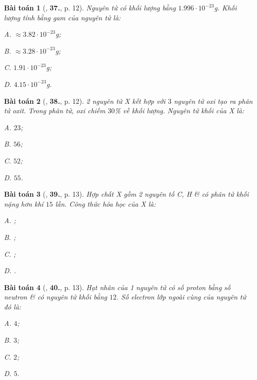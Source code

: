 \documentclass{article}
\numberwithin{equation}{section}
\newtheorem{baitoan}{Bài toán}[section]
\begin{document}
\begin{baitoan}[\cite{An2011}, \textbf{37.}, p. 12]
	Nguyên tử  có khối lượng bằng $1.996\cdot 10^{-23}$g. Khối lượng tính bằng gam của nguyên tử  là:
	\begin{enumerate*}
		\item[{\rm\sf A.}] $\approx3.82\cdot10^{-23}$g;
		\item[{\rm\sf B.}] $\approx3.28\cdot10^{-23}$g;
		\item[{\rm\sf C.}] $1.91\cdot10^{-23}$g;
		\item[{\rm\sf D.}] $4.15\cdot10^{-23}$g.
	\end{enumerate*}
\end{baitoan}

\begin{baitoan}[\cite{An2011}, \textbf{38.}, p. 12]
	2 nguyên tử X kết hợp với $3$ nguyên tử oxi tạo ra phân tử oxit. Trong phân tử, oxi chiếm $30$\% về khối lượng. Nguyên tử khối của X là:
	\begin{enumerate*}
		\item[{\rm\sf A.}] $23$;
		\item[{\rm\sf B.}] $56$;
		\item[{\rm\sf C.}] $52$;
		\item[{\rm\sf D.}] $55$.
	\end{enumerate*}
\end{baitoan}

\begin{baitoan}[\cite{An2011}, \textbf{39.}, p. 13]
	Hợp chất X gồm 2 nguyên tố C, H \& có phân tử khối nặng hơn khí  $15$ lần. Công thức hóa học của X là:
	\begin{enumerate*}
		\item[{\rm\sf A.}] ;
		\item[{\rm\sf B.}] ;
		\item[{\rm\sf C.}] ;
		\item[{\rm\sf D.}] .
	\end{enumerate*}
\end{baitoan}

\begin{baitoan}[\cite{An2011}, \textbf{40.}, p. 13]
	Hạt nhân của 1 nguyên tử có số proton bằng số neutron \& có nguyên tử khối bằng $12$. Số electron lớp ngoài cùng của nguyên tử đó là:
	\begin{enumerate*}
		\item[{\rm\sf A.}] $4$;
		\item[{\rm\sf B.}] $3$;
		\item[{\rm\sf C.}] $2$;
		\item[{\rm\sf D.}] $5$.
	\end{enumerate*}
\end{baitoan}
\end{document}
